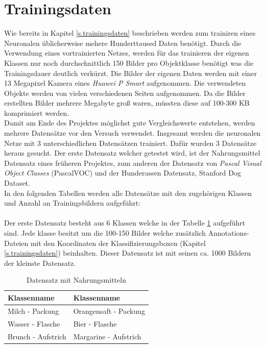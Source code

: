   \section{Trainingsdaten}\label{s.tdaten}
Wie bereits in Kapitel \ref{s.trainingsdaten} beschrieben werden zum trainiren eines Neuronalen üblicherweise mehere Hunderttaused Daten benötigt. Durch die Verwendung eines vortrainierten Netzes, werden für das trainieren der eigenen Klassen nur noch durchschnittlich 150 Bilder pro Objektklasse benötigt was die Trainingsdauer deutlich verkürzt. Die Bilder der eigenen Daten werden mit einer 13 Megapixel Kamera eines \textit{Huawei P Smart} aufgenommen. Die verwendeten Objekte werden von vielen verschiedenen Seiten aufgenommen. Da die Bilder erstellten Bilder mehrere Megabyte groß waren, müssten diese auf 100-300 KB komprimiert werden.\\ %
Damit am Ende des Projektes möglichst gute Vergleichswerte entstehen, werden mehrere Datensätze vor den Versuch verwendet. Insgesamt werden die neuronalen Netze mit 3 unterschiedlichen Datensätzen trainiert. Dafür wurden 3 Datensätze heraus gesucht. Der erste Datensatz welcher getestet wird, ist der Nahrungsmittel Datensatz eines früheren Projektes, zum anderen der Datensatz von \textit{Pascal Visual Object Classes} (PascalVOC) und der Hunderassen Datensatz, Stanford Dog Dataset.\\
In den folgenden Tabellen werden alle Datensätze mit den zugehörigen Klassen und Anzahl an Trainingsbildern aufgeführt:\\\\
Der erste Datensatz besteht aus 6 Klassen welche in der Tabelle \ref{tab:nahrungsmittel} aufgeführt sind. Jede klasse besitzt um die 100-150 Bilder welche zusätzlich Annotations-Dateien mit den Koordinaten der Klassifizierungsboxen (Kapitel \ref{s.trainingsdaten}) beinhalten. Dieser Datensatz ist mit seinen ca. 1000 Bildern der kleinste Datensatz. 
\begin{table}
[h]
\caption{Datensatz mit Nahrungsmitteln}
\centering
\begin{tabular}{|l|l|}
\hline
Klassenname & Klassenname\\
\hline
Milch - Packung & Orangensaft - Packung\\
Wasser - Flasche & Bier - Flasche\\
Brunch - Aufstrich & Margarine - Aufstrich\\
\hline
\end{tabular}
\label{tab:nahrungsmittel}
\end{table}
